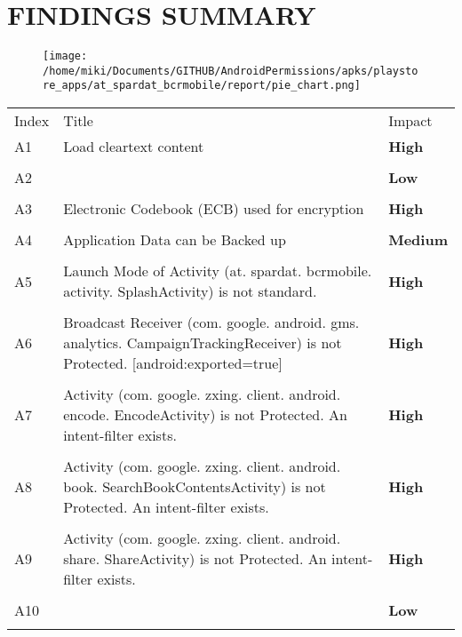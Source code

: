 \documentclass[12p]{article}
\begin{document}
\section{FINDINGS SUMMARY}\label{sec:summary}
\begin{figure}[H]
\centering
	\texttt{[image: /home/miki/Documents/GITHUB/AndroidPermissions/apks/playstore\_apps/at\_spardat\_bcrmobile/report/pie\_chart.png]}
\end{figure}
	\begin{longtable}{p{0.5cm} p{10cm} p{1.5cm}}
	\rowcolor{grannysmithapple!70} Index & Title & Impact \\
	A1&Load cleartext content& \color{ferrarired}\textbf{High} \\
\hline\\	A2&& \color{amber}\textbf{Low} \\
\hline\\	A3&Electronic Codebook \newline (ECB) used for encryption& \color{ferrarired}\textbf{High} \\
\hline\\	A4&Application Data can be Backed up& \color{orange(colorwheel)}\textbf{Medium} \\
\hline\\	A5&Launch Mode of Activity \newline (at. spardat. bcrmobile. activity. SplashActivity) is not standard.& \color{ferrarired}\textbf{High} \\
\hline\\	A6&Broadcast Receiver \newline (com. google. android. gms. analytics. CampaignTrackingReceiver) is not Protected. [android:exported=true]& \color{ferrarired}\textbf{High} \\
\hline\\	A7&Activity \newline (com. google. zxing. client. android. encode. EncodeActivity) is not Protected. An intent-filter exists.& \color{ferrarired}\textbf{High} \\
\hline\\	A8&Activity \newline (com. google. zxing. client. android. book. SearchBookContentsActivity) is not Protected. An intent-filter exists.& \color{ferrarired}\textbf{High} \\
\hline\\	A9&Activity \newline (com. google. zxing. client. android. share. ShareActivity) is not Protected. An intent-filter exists.& \color{ferrarired}\textbf{High} \\
\hline\\	A10&& \color{amber}\textbf{Low} \\
\hline\\	\end{longtable}
\cleardoublepage
\newpage
\end{document}
